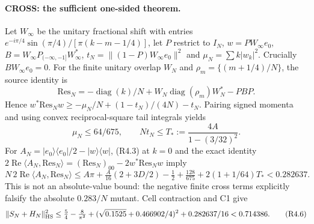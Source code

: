\paragraph{CROSS: the sufficient one-sided theorem.}
Let $W_\infty$ be the unitary fractional shift with entries
$e^{-i\pi/4}\sin(\pi/4)/[\pi(k-m-1/4)]$, let $P$ restrict to $I_N$,
$w=P W_\infty e_0$, $B=W_\infty P_{(-\infty,-1]}W_\infty^*$,
$t_N=\|(1-P)W_\infty e_0\|^2$ and $\mu_N=\sum k|w_k|^2$.
Crucially $BW_\infty e_0=0$. For the finite unitary overlap $W_N$ and
$\rho_m=\{(m+1/4)/N\}$, the source identity is
\[
 \mathrm{Res}_N=-\operatorname{diag}(k)/N+W_N\operatorname{diag}(\rho_m)W_N^*-PBP.
\]
Hence $w^*\mathrm{Res}_Nw\ge-\mu_N/N+(1-t_N)/(4N)-t_N$.
Pairing signed momenta and using convex reciprocal-square tail integrals yields
\[
 \mu_N\le64/675,\qquad Nt_N\le T_*:=\frac{4A}{1-(3/32)^2}.
\]
For $A_N=|e_0\rangle\langle e_0|/2-|w\rangle\langle w|$, (R4.3) at
$k=0$ and the exact identity
$2\operatorname{Re}\langle A_N,\mathrm{Res}_N\rangle
=(\mathrm{Res}_N)_{00}-2w^*\mathrm{Res}_Nw$ imply
\[
 N\,2\operatorname{Re}\langle A_N,\mathrm{Res}_N\rangle
 \le A\pi+\tfrac A{16}(2+3D/2)-\tfrac12+\tfrac{128}{675}
                +2(1+1/64)T_*<0.282637.                   \tag{R4.5}
\]
This is not an absolute-value bound: the negative finite cross terms
explicitly falsify the absolute $0.283/N$ mutant. Cell contraction and C1 give
\[
 \|S_N+H_N\|_{\rm HS}^2
 \le\tfrac54-\tfrac8{\pi^2}
       +(\sqrt{0.1525}+0.466902/4)^2+0.282637/16<0.714386. \tag{R4.6}
\]

